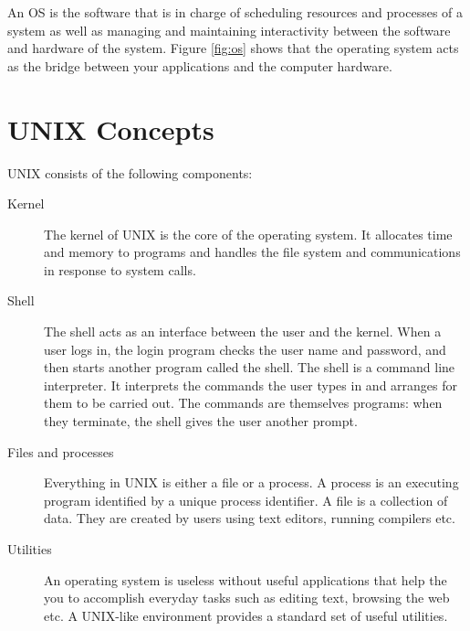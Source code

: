 An OS is the software that is in charge of scheduling resources and processes 
of a system as well as managing and maintaining interactivity between the
software and hardware of the system. Figure \ref{fig:os} shows that the
operating system acts as the bridge between your applications and the computer
hardware.  
\section{UNIX Concepts}
UNIX consists of the following components:
\begin{description}
\item[Kernel] The kernel of UNIX is the core of the operating system. It
allocates time and memory to programs and handles the file system and
communications in response to system calls.  
\item[Shell] The shell acts as an interface between the user and the kernel.
When a user logs in, the login program checks the user name and password, and
then starts another program called the shell.   The shell is a command line
interpreter. It interprets the commands the user types in and arranges for them
to be carried out. The commands are themselves programs: when they terminate,
the shell gives the user another prompt.  
\item[Files and processes] Everything in UNIX is either a file or a process.  A
process is an executing program identified by a unique process identifier.  A
file is a collection of data. They are created by users using text editors,
running compilers etc.
\item[Utilities] An operating system is useless without useful applications that
help the you to accomplish everyday tasks such as editing text, browsing the web
etc.  A UNIX-like environment provides a standard set of useful utilities.  
\end{description}

